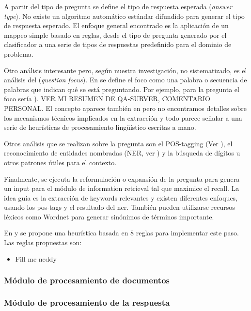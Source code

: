 A partir del tipo de pregunta se define el tipo de respuesta esperada (\textit{answer type}). No existe un algoritmo automático estándar difundido para generar el tipo de respuesta esperado. El enfoque general encontrado es la aplicación de un mappeo simple basado en reglas, desde el tipo de pregunta generado por el clasificador a una serie de tipos de respuestas predefinido para el dominio de problema.

Otro análisis interesante pero, según nuestra investigación, no sistematizado, es el análisis del  (\textit{question focus}). En \cite{QA3} se define el foco como una palabra o secuencia de palabras que indican qué se está preguntando. Por ejemplo, para la pregunta  el foco sería ). {\color{red} VER MI RESUMEN DE QA-SURVER, COMENTARIO PERSONAL}. El concepto aparece también en \cite{WATSON1} pero no encontramos detalles sobre los mecanismos técnicos implicados en la extracción y todo parece señalar a una serie de heurísticas de procesamiento lingüístico escritas a mano. 

Otros análisis que se realizan sobre la pregunta son el POS-tagging (Ver ), el reconocimiento de entidades nombradas (NER, ver ) y la búsqueda de dígitos u otros patrones útiles para el contexto. 

Finalmente, se ejecuta la reformulación o expansión de la pregunta para genera un input para el módulo de information retrieval tal que maximice el recall. 
La idea guía es la extracción de keywords relevantes y existen diferentes enfoques, usando los pos-tags y el resultado del ner. También pueden utilizarse recursos léxicos como Wordnet para generar sinónimos de términos importante. 

En \cite{QA1} y \cite{QA3} se propone una heurística basada en 8 reglas para implementar este paso. Las reglas propuestas son:

\begin{itemize}
\item {\color{red} Fill me neddy}
\end{itemize}

\subsubsection*{Módulo de procesamiento de documentos}
\subsubsection*{Módulo de procesamiento de la respuesta}

